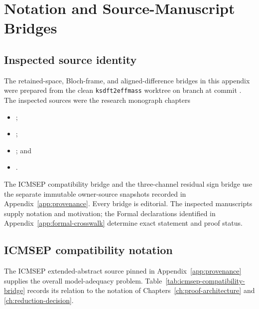 \chapter{Notation and Source-Manuscript Bridges}
\label{app:notation-bridges}
\small
\sloppy
{}

\section{Inspected source identity}

The retained-space, Bloch-frame, and aligned-difference bridges in this appendix were
prepared from the clean \texttt{ksdft2effmass} worktree on branch
 at commit
. The inspected sources were the research
monograph chapters

\begin{itemize}
  \item {};
  \item {};
  \item {}; and
  \item {}.
\end{itemize}

The ICMSEP compatibility bridge and the three-channel residual sign bridge use the
separate immutable owner-source snapshots recorded in Appendix~\ref{app:provenance}.
Every bridge is editorial. The inspected manuscripts supply notation and motivation;
the Formal declarations identified in Appendix~\ref{app:formal-crosswalk} determine
exact statement and proof status.

\section{ICMSEP compatibility notation}

The ICMSEP extended-abstract source pinned in Appendix~\ref{app:provenance} supplies the
overall model-adequacy problem.  Table~\ref{tab:icmsep-compatibility-bridge} records its
relation to the notation of Chapters~\ref{ch:proof-architecture} and
\ref{ch:reduction-decision}.

